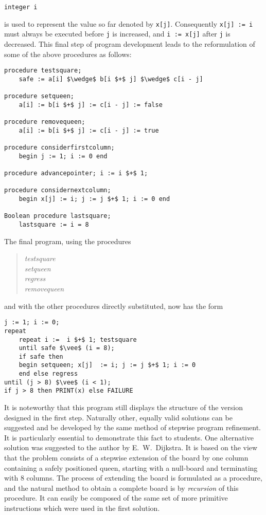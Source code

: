 \begin{lstlisting}
integer i
\end{lstlisting}

is used to represent the value so far denoted by \verb|x[j]|.  Consequently
\verb|x[j] := i| must always be executed before \verb|j| is increased, and
\verb|i := x[j]| after \verb|j| is decreased.  This final step of program
development leads to the reformulation of some of the above procedures as
follows:

\begin{lstlisting}
procedure testsquare;
    safe := a[i] $\wedge$ b[i $+$ j] $\wedge$ c[i - j]

procedure setqueen;
    a[i] := b[i $+$ j] := c[i - j] := false

procedure removequeen;
    a[i] := b[i $+$ j] := c[i - j] := true

procedure considerfirstcolumn;
    begin j := 1; i := 0 end

procedure advancepointer; i := i $+$ 1;

procedure considernextcolumn;
    begin x[j] := i; j := j $+$ 1; i := 0 end

Boolean procedure lastsquare;
    lastsquare := i = 8
\end{lstlisting}

The final program, using the procedures

\begin{quote}
\emph{testsquare}\\
\emph{setqueen}\\
\emph{regress}\\
\emph{removequeen}\\
\end{quote}

and with the other procedures directly substituted, now has the form

\begin{lstlisting}
j := 1; i := 0;
repeat
    repeat i :=  i $+$ 1; testsquare
    until safe $\vee$ (i = 8);
    if safe then
    begin setqueen; x[j]  := i; j := j $+$ 1; i := 0
    end else regress
until (j > 8) $\vee$ (i < 1);
if j > 8 then PRINT(x) else FAILURE
\end{lstlisting}

It is noteworthy that this program still displays the structure of the version
designed in the first step. Naturally other, equally valid solutions can be
suggested and be developed by the same method of stepwise program refinement.
It is particularly essential to demonstrate this fact to students.  One
alternative solution was suggested to the author by E.~W.~Dijkstra.  It is
based on the view that the problem consists of a stepwise extension of the
board by one column containing a safely positioned queen, starting with a
null-board and terminating with 8 columns. The process of extending the board
is formulated as a procedure, and the natural method to obtain a complete board
is by \emph{recursion} of this procedure. It can easily be composed of the same
set of more primitive instructions which were used in the first solution.

